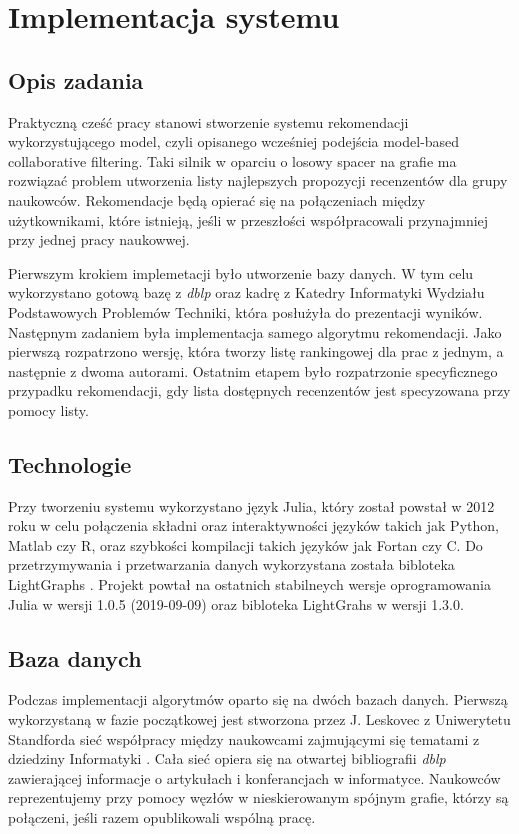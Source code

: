 \chapter{Implementacja systemu}
\thispagestyle{chapterBeginStyle}

\section{Opis zadania}

Praktyczną cześć pracy stanowi stworzenie systemu rekomendacji wykorzystującego model, czyli opisanego wcześniej podejścia model-based collaborative filtering. Taki silnik w oparciu o losowy spacer na grafie ma rozwiązać problem utworzenia listy najlepszych propozycji recenzentów dla grupy naukowców. Rekomendacje będą opierać się na połączeniach między użytkownikami, które istnieją, jeśli w przeszłości współpracowali przynajmniej przy jednej pracy naukowwej. 

Pierwszym krokiem implemetacji było utworzenie bazy danych. W tym celu wykorzystano gotową bazę z \textit{dblp} oraz kadrę z Katedry Informatyki Wydziału Podstawowych Problemów Techniki, która posłużyła do prezentacji wyników. Następnym zadaniem była implementacja samego algorytmu rekomendacji. Jako pierwszą rozpatrzono wersję, która tworzy listę rankingowej dla prac z jednym, a następnie z dwoma autorami. Ostatnim etapem było rozpatrzonie specyficznego przypadku rekomendacji, gdy lista dostępnych recenzentów jest specyzowana przy pomocy listy.

\section{Technologie}

Przy tworzeniu systemu wykorzystano język Julia, który został powstał w 2012 roku w celu połączenia składni oraz interaktywności języków takich jak Python, Matlab czy R, oraz szybkości kompilacji takich języków jak Fortan czy C. Do przetrzymywania i przetwarzania danych wykorzystana została bibloteka LightGraphs \cite{Bromberger17}. Projekt powtał na ostatnich stabilneych wersje oprogramowania Julia w wersji 1.0.5 (2019-09-09) oraz bibloteka LightGrahs w wersji 1.3.0.


\section{Baza danych}

Podczas implementacji algorytmów oparto się na dwóch bazach danych. Pierwszą wykorzystaną w fazie początkowej jest stworzona przez J. Leskovec z Uniwerytetu Standforda sieć współpracy między naukowcami zajmującymi się tematami z dziedziny Informatyki \cite{SNAPDB}. Cała sieć opiera się na otwartej bibliografii \textit{dblp} zawierającej informacje o artykułach i konferancjach w informatyce. Naukowców reprezentujemy przy pomocy węzłów w nieskierowanym spójnym grafie, którzy są połączeni, jeśli razem opublikowali wspólną pracę. 

